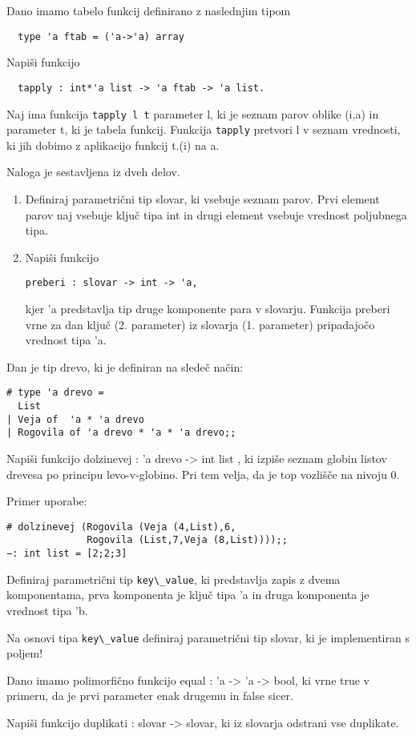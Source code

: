 \begin{ex}
  Dano imamo tabelo funkcij definirano z naslednjim tipom
\begin{lstlisting}
  type 'a ftab = ('a->'a) array
\end{lstlisting}
  Napi\v si funkcijo
\begin{lstlisting}
  tapply : int*'a list -> 'a ftab -> 'a list.
\end{lstlisting}
  Naj ima funkcija \lstinline{tapply l t} parameter l, ki je seznam parov oblike
  (i,a) in parameter t, ki je tabela funkcij. Funkcija \lstinline{tapply} pretvori
  l v seznam vrednosti, ki jih dobimo z aplikacijo funkcij t.(i) na a.


\end{ex} 
\begin{ex}
Naloga je sestavljena iz dveh delov.
\begin{enumerate}
    \item Definiraj parametri\v cni tip slovar, ki vsebuje seznam parov. Prvi element parov naj vsebuje klju\v c tipa int in drugi element vsebuje vrednost poljubnega tipa.
    \item Napi\v si funkcijo 
\begin{lstlisting}
preberi : slovar -> int -> 'a, 
\end{lstlisting}
kjer 'a predstavlja tip druge komponente para v slovarju. Funkcija preberi vrne za dan klju\v c (2. parameter) iz slovarja (1. parameter) pripadajo\v co vrednost tipa 'a.
\end{enumerate}
\end{ex} 
\begin{ex}
Dan je tip drevo, ki je definiran na slede\v c na\v cin:

\begin{lstlisting}
# type 'a drevo =
  List
| Veja of  'a * 'a drevo
| Rogovila of 'a drevo * 'a * 'a drevo;;
\end{lstlisting}
Napi\v si funkcijo dolzinevej : 'a drevo -> int list , ki izpi\v se seznam globin listov drevesa po principu levo-v-globino. Pri tem velja, da je top vozli\v s\v ce na nivoju 0.

Primer uporabe:

\begin{lstlisting}
# dolzinevej (Rogovila (Veja (4,List),6,
              Rogovila (List,7,Veja (8,List))));;
−: int list = [2;2;3]
\end{lstlisting}
\end{ex} 
\begin{ex}
Definiraj parametri\v cni tip \lstinline{key\_value}, ki predstavlja zapis z dvema komponentama, prva komponenta je klju\v c tipa 'a in druga komponenta je vrednost tipa 'b. 

Na osnovi tipa \lstinline{key\_value} definiraj parametri\v cni tip slovar, ki je implementiran s poljem! 

Dano imamo polimorfi\v cno funkcijo equal : 'a -> 'a -> bool, ki vrne true v primeru, da je prvi parameter enak drugemu in false sicer. 

Napi\v si funkcijo duplikati : slovar -> slovar, ki iz slovarja odstrani vse duplikate. 


\end{ex} 
